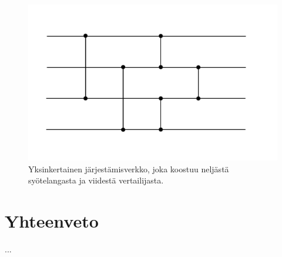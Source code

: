 \documentclass[a4paper,11pt]{article}
\begin{document}
\begin{figure}
\centering
\includegraphics[scale = 0.45]{sortingnetwork}
\caption{Yksinkertainen järjestämisverkko, joka koostuu neljästä syötelangasta ja viidestä vertailijasta.}
\label{fig:sortingnetwork}
\end{figure}

\section{Yhteenveto}

...

\printbibliography
\end{document}

